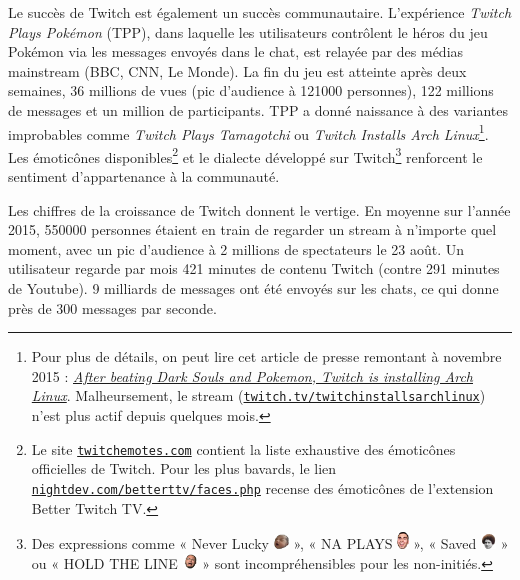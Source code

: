 \documentclass[a4paper]{article}
\begin{document}
Le succès de Twitch est également un succès communautaire. L'expérience \textit{Twitch Plays Pokémon} (TPP), dans laquelle les utilisateurs contrôlent le héros du jeu Pokémon via les messages envoyés dans le chat, est relayée par des médias mainstream (BBC, CNN, Le Monde). La fin du jeu est atteinte après deux semaines, 36 millions de vues (pic d'audience à 121000 personnes), 122 millions de messages et un million de participants\cite{Gadget2014}. TPP a donné naissance à des variantes improbables comme \textit{Twitch Plays Tamagotchi} ou \textit{Twitch Installs Arch Linux}\footnote{Pour plus de détails, on peut lire cet article de presse remontant à novembre 2015 : \href{http://www.pcworld.com/article/3001378/operating-systems/after-beating-dark-souls-and-pokemon-twitch-is-installing-arch-linux.html}{\textit{After beating Dark Souls and Pokemon, Twitch is installing Arch Linux}}. Malheursement, le stream (\href{https://www.twitch.tv/twitchinstallsarchlinux}{\texttt{twitch.tv/twitchinstallsarchlinux}}) n'est plus actif depuis quelques mois.}. Les émoticônes disponibles\footnote{Le site \href{https://twitchemotes.com/}{\texttt{twitchemotes.com}} contient la liste exhaustive des émoticônes officielles de Twitch. Pour les plus bavards, le lien \href{https://nightdev.com/betterttv/faces.php}{\texttt{nightdev.com/betterttv/faces.php}} recense des émoticônes de l'extension Better Twitch TV.} et le dialecte développé sur Twitch\footnote{Des expressions comme « Never Lucky \includegraphics[width=0.4cm]{BabyRage.jpg} », « NA PLAYS \includegraphics[width=0.3cm]{4Head.png} », « Saved \includegraphics[width=0.4cm]{KappaRoss.png} » ou « HOLD THE LINE \includegraphics[width=0.4cm]{WutFace.png} » sont incompréhensibles pour les non-initiés.} renforcent le sentiment d'appartenance à la communauté. 

Les chiffres de la croissance de Twitch donnent le vertige. En moyenne sur l'année 2015, 550000 personnes étaient en train de regarder un stream à n'importe quel moment, avec un pic d'audience à 2 millions de spectateurs le 23 août. Un utilisateur regarde par mois 421 minutes de contenu Twitch (contre 291 minutes de Youtube). 9 milliards de messages ont été envoyés sur les chats, ce qui donne près de 300 messages par seconde\cite{Retro2015}.
\end{document}

